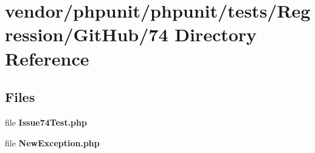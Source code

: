 \section{vendor/phpunit/phpunit/tests/\+Regression/\+Git\+Hub/74 Directory Reference}
\label{dir_09c1473e267de37c901be12653efb777}
\subsection*{Files}
\begin{DoxyCompactItemize}
\item 
file {\bf Issue74\+Test.\+php}
\item 
file {\bf New\+Exception.\+php}
\end{DoxyCompactItemize}
